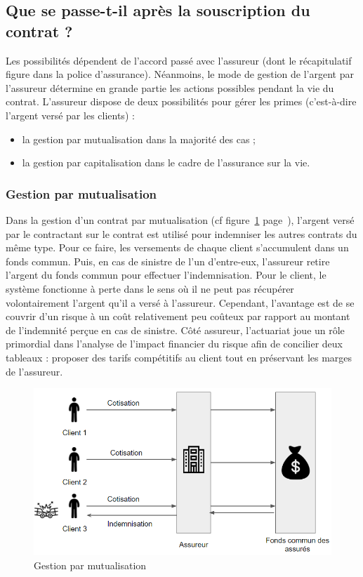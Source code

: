 \documentclass{article}
\begin{document}
\subsection{Que se passe-t-il après la souscription du contrat ?}
Les possibilités dépendent de l'accord passé avec l'assureur (dont le récapitulatif figure dans la police d'assurance). Néanmoins, le mode de gestion de l'argent par l'assureur détermine en grande partie les actions possibles pendant la vie du contrat. L'assureur dispose de deux possibilités pour gérer les primes (c'est-à-dire l'argent versé par les clients) :

\begin{itemize}
    \item la gestion par mutualisation dans la majorité des cas ;
    \item la gestion par capitalisation dans le cadre de l'assurance sur la vie.
\end{itemize}

\subsubsection{Gestion par mutualisation}
Dans la gestion d'un contrat par mutualisation (cf figure~\ref{gestion_mutualisation} page~\pageref{gestion_mutualisation}), l'argent versé par le contractant sur le contrat est utilisé pour indemniser les autres contrats du même type. Pour ce faire, les versements de chaque client s'accumulent dans un fonds commun. Puis, en cas de sinistre de l'un d'entre-eux, l'assureur retire l'argent du fonds commun pour effectuer l'indemnisation. Pour le client, le système fonctionne à perte dans le sens où il ne peut pas récupérer volontairement l'argent qu'il a versé à l'assureur. Cependant, l'avantage est de se couvrir d'un risque à un coût relativement peu coûteux par rapport au montant de l'indemnité perçue en cas de sinistre. Côté assureur, l'actuariat joue un rôle primordial dans l'analyse de l'impact financier du risque afin de concilier deux tableaux : proposer des tarifs compétitifs au client tout en préservant les marges de l'assureur.

\begin{figure}[h!]
    \includegraphics[width=\textwidth]{resources/gestion_mutualisation.PNG}
    \caption{
        \label{gestion_mutualisation} Gestion par mutualisation
    }
\end{figure}
\end{document}
